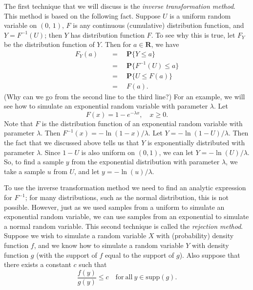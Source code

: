 \documentclass{stml-l}
\theoremstyle{definition}
\numberwithin{equation}{chapter}
\numberwithin{figure}{chapter}
\numberwithin{figure}{section}
\begin{document}
The first technique that we will discuss is the \emph{inverse
transformation method}. This method is based on the following fact.
Suppose $U$ is a uniform random variable on $(0,\,1)$, $F$ is any
continuous (cumulative) distribution function, and $Y=F^{-1}(U)$;
then $Y$ has distribution function $F$. To see why this is true, let
$F_{Y}$ be the distribution function of $Y$. Then for $a\in
\mathbf{R}$, we have
\begin{align*}
F_{Y}(a)&\quad =\quad \mathbf{P}\{Y\leq a\}\\
&\quad =\quad \mathbf{P}\{F^{-1}(U)\leq a\}\\
&\quad =\quad \mathbf{P}\{U\leq F(a)\}\\
&\quad =\quad F(a).
\end{align*}
(Why can we go from the second line to the third line?) For an
example, we will see how to simulate an exponential random variable
with parameter $\lambda$. Let
\begin{equation*}
F(x)=1-e^{-\lambda x},\quad x\geq 0.
\end{equation*}
Note that $F$ is the distribution function of an exponential random
variable with parameter $\lambda$. Then $
F^{-1}(x)=-\ln(1-x)/\lambda$. Let $Y=-\ln(1-U)/\lambda$. Then the
fact that we discussed above tells us that $Y$ is exponentially
distributed with parameter $\lambda$. Since $1-U$ is also uniform on
$(0,1)$, we can let $Y=-\ln(U)/\lambda$. So, to find a sample $y$
from the exponential distribution with parameter $\lambda$, we take
a sample $u$ from $U$, and let $y=-\ln(u)/\lambda$.

To use the inverse transformation method we need to find an analytic
expression for $F^{-1}$; for many distributions, such as the normal
distribution, this is not possible. However, just as we used samples
from a uniform to simulate an exponential random variable, we can
use samples from an exponential to simulate a normal random
variable. This second technique is called the \emph{rejection
method}. Suppose we wish to simulate a random variable $X$ with
(probability) density function $f$, and we know how to simulate a
random variable $Y$ with density function $g$ (with the support of
$f$ equal to the support of $g$). Also suppose that there exists a
constant $c$ such that
\begin{equation*}
\frac{f(y)}{g(y)}\leq c\quad \mathrm{for\ all}\ y\in
\mathrm{supp}(g).
\end{equation*}
\end{document}
